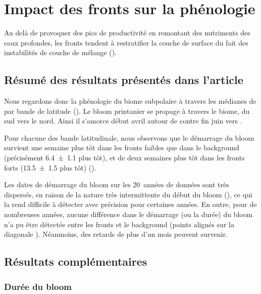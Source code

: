 
\chapter{Impact des fronts sur la phénologie}
\addChpLof
\label{chp:res-phenologie}
\graphicspath{{resources/res_phénologie}}

{
  \hypersetup{hidelinks}
  \minitoc%
  \clearpage
}

Au delà de provoquer des pics de productivité en remontant des nutriments des eaux profondes, les fronts tendent à restratifier la couche de surface du fait des instabilités de couche de mélange ().

\section{Résumé des résultats présentés dans l'article}
\label{sec:resume-res-phenologie}

Nous regardons donc la phénologie du biome subpolaire à travers les médianes de  par bande de latitude ().
Le bloom printanier se propage à travers le biome, du sud vers le nord.
Ainsi il s'amorce début avril autour de  contre fin juin vers .

Pour chacune des bande latitudinale, nous observons que le démarrage du bloom survient une semaine plus tôt dans les fronts faibles que dans le background (précisément \qty{6.4 \pm 1.1}{\jours} plus tôt), et de deux semaines plus tôt dans les fronts forts (\qty{13.5 \pm 1.5}{\jours} plus tôt) ().

Les dates de démarrage du bloom sur les 20~années de données sont très dispersés, en raison de la nature très intermittente du début du bloom (\cite{keerthi_2021}), ce qui la rend difficile à détecter avec précision pour certaines années.
En outre, pour de nombreuses années, aucune différence dans le démarrage (ou la durée) du bloom n'a pu être détectée entre les fronts et le background (points alignés sur la diagonale ).
Néanmoins, des retards de plus d'un mois peuvent survenir.

\section{Résultats complémentaires}
\label{sec:complements-phenologie}

\subsection{Durée du bloom}
\label{sec:duree-bloom}

